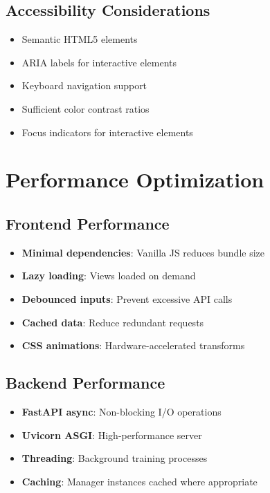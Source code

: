 \documentclass[12pt,a4paper]{article}
\begin{document}
\subsection{Accessibility Considerations}

\begin{itemize}[leftmargin=*]
    \item Semantic HTML5 elements
    \item ARIA labels for interactive elements
    \item Keyboard navigation support
    \item Sufficient color contrast ratios
    \item Focus indicators for interactive elements
\end{itemize}

\section{Performance Optimization}

\subsection{Frontend Performance}

\begin{itemize}[leftmargin=*]
    \item \textbf{Minimal dependencies}: Vanilla JS reduces bundle size
    \item \textbf{Lazy loading}: Views loaded on demand
    \item \textbf{Debounced inputs}: Prevent excessive API calls
    \item \textbf{Cached data}: Reduce redundant requests
    \item \textbf{CSS animations}: Hardware-accelerated transforms
\end{itemize}

\subsection{Backend Performance}

\begin{itemize}[leftmargin=*]
    \item \textbf{FastAPI async}: Non-blocking I/O operations
    \item \textbf{Uvicorn ASGI}: High-performance server
    \item \textbf{Threading}: Background training processes
    \item \textbf{Caching}: Manager instances cached where appropriate
\end{itemize}
\end{document}
